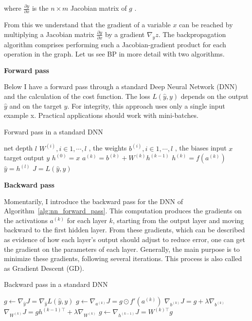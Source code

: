 where $\frac{\partial y}{\partial x}$ is the $n \times m$ Jacobian matrix of $g$ .

From this we understand that the gradient of a variable $x$ can be reached by multiplying a Jacobian matrix
$\frac{\partial y}{\partial x}$ by a gradient $\nabla_y z$.
The backpropagation algorithm comprises performing such a Jacobian-gradient product for each operation in the graph.
Let us see BP in more detail with two algorithms.

\textbf{Forward pass}

Below I have a forward pass through a standard Deep Neural Network (DNN) and the calculation of the cost function.
The loss $L(\hat{y}, y)$ depends on the output $\hat{y}$ and on the target $y$.
For integrity, this approach uses only a single input example x.
Practical applications should work with mini-batches.

\begin{algorithm}[H]
    \caption{Forward pass in a standard DNN}
    \begin{algorithmic}
        \REQUIRE net depth $l$
        \REQUIRE $W^{(i)} , i \in {1, \cdots , l}$ , the weights
        \REQUIRE $b^{(i)} , i \in {1, \cdots , l}$ , the biases
        \REQUIRE input $x$
        \REQUIRE target output $y$
        \STATE $h^{(0)} = x$
        \STATE $a^{(k)} = b^{(k)} + W^{(k)} h^{(k-1)}$
        \STATE $h^{(k)} = f(a^{(k)})$
        \ENDFOR
        \STATE $\hat{y} = h^{(l)}$
        \STATE $J = L(\hat{y},y)$
    \end{algorithmic}\label{alg:nn_forward_pass}
\end{algorithm}

\textbf{Backward pass}

Momentarily, I introduce the backward pass for the DNN of Algorithm~\ref{alg:nn_forward_pass}.
This computation produces the gradients on the activations $a^{(k)}$ for each layer $k$, starting from the output layer and moving backward to the first hidden layer.
From these gradients, which can be described as evidence of how each layer’s output should adjust to reduce error, one can get the gradient on the parameters of each layer.
Generally, the main purpose is to minimize these gradients, following several iterations.
This process is also called as Gradient Descent (GD).

\begin{algorithm}[H]
    \caption{Backward pass in a standard DNN}
    \begin{algorithmic}
        \STATE $g \leftarrow \nabla_{\hat{y}} J = \nabla_{\hat{y}} L(\hat{y},y)$
        \STATE $g \leftarrow \nabla_{a^{(k)}} J = g \odot f'(a^{(k)})$
        \STATE $\nabla_{b^{(k)}} J = g + \lambda \nabla_{b^{(k)}}$
        \STATE $\nabla_{W^{(k)}} J = g h^{(k-1)\top} + \lambda \nabla_{W^{(k)}}$
        \STATE $g \leftarrow \nabla_{h^{(k-1)}} J = W^{(k)\top} g$
        \ENDFOR
    \end{algorithmic}\label{alg:nn_backward_pass}
\end{algorithm}


